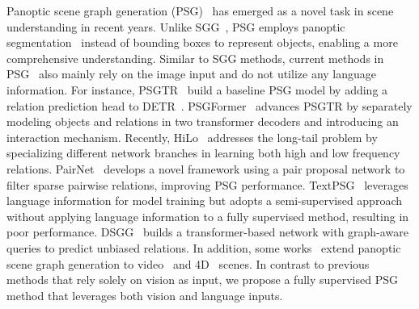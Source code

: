 Panoptic scene graph generation (PSG)~\citep{yang2022panoptic} has emerged as a novel task in scene understanding in recent years.
Unlike SGG~\citep{lu2016visual}, PSG employs panoptic segmentation~\citep{kirillov2019panoptic} instead of bounding boxes to represent objects, enabling a more comprehensive understanding.
Similar to SGG methods, current methods in PSG~\citep{yang2022panoptic, zhou2023hilo, wang2023pair, li2023panoptic, hayder2024dsgg, lorenz2024fair} also mainly rely on the image input and do not utilize any language information.
For instance, PSGTR~\citep{yang2022panoptic} build a baseline PSG model by adding a relation prediction head to DETR~\citep{carion2020end}.
PSGFormer~\citep{yang2022panoptic} advances PSGTR by separately modeling objects and relations in two transformer decoders and introducing an interaction mechanism. 
Recently, HiLo~\citep{zhou2023hilo} addresses the long-tail problem by specializing different network branches in learning both high and low frequency relations. 
PairNet~\citep{wang2023pair} develops a novel framework using a pair proposal network to filter sparse pairwise relations, improving PSG performance.
TextPSG~\citep{zhao2023textpsg} leverages language information for model training but adopts a semi-supervised approach without applying language information to a fully supervised method, resulting in poor performance.
DSGG~\citep{hayder2024dsgg} builds a transformer-based network with graph-aware queries to predict unbiased relations.
In addition, some works~\citep{yang2023panoptic, yang20234d} extend panoptic scene graph generation to video~\citep{yang2023panoptic} and 4D~\citep{yang20234d} scenes.
In contrast to previous methods that rely solely on vision as input, we propose a fully supervised PSG method that leverages both vision and language inputs.


